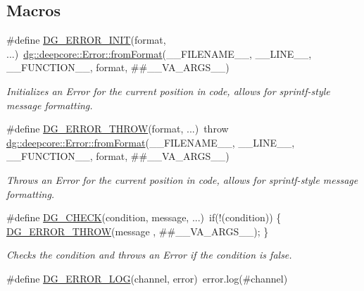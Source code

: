 \subsection*{Macros}
\begin{DoxyCompactItemize}
\item 
\#define \hyperlink{group___utility_module_ga3fd0b6b41d830c2e3b357841465ace88}{D\+G\+\_\+\+E\+R\+R\+O\+R\+\_\+\+I\+N\+IT}(format, ...)~\hyperlink{group___utility_module_ga00500e337578c7170d2608cb93af4f51}{dg\+::deepcore\+::\+Error\+::from\+Format}(\+\_\+\+\_\+\+F\+I\+L\+E\+N\+A\+M\+E\+\_\+\+\_\+, \+\_\+\+\_\+\+L\+I\+N\+E\+\_\+\+\_\+, \+\_\+\+\_\+\+F\+U\+N\+C\+T\+I\+O\+N\+\_\+\+\_\+, format, \#\#\+\_\+\+\_\+\+V\+A\+\_\+\+A\+R\+G\+S\+\_\+\+\_\+)
\begin{DoxyCompactList}\small\item\em Initializes an Error for the current position in code, allows for sprintf-\/style message formatting. \end{DoxyCompactList}\item 
\#define \hyperlink{group___utility_module_ga71c74d9e1b6d7f9d8896d6818a5a0cdf}{D\+G\+\_\+\+E\+R\+R\+O\+R\+\_\+\+T\+H\+R\+OW}(format, ...)~throw \hyperlink{group___utility_module_ga00500e337578c7170d2608cb93af4f51}{dg\+::deepcore\+::\+Error\+::from\+Format}(\+\_\+\+\_\+\+F\+I\+L\+E\+N\+A\+M\+E\+\_\+\+\_\+, \+\_\+\+\_\+\+L\+I\+N\+E\+\_\+\+\_\+, \+\_\+\+\_\+\+F\+U\+N\+C\+T\+I\+O\+N\+\_\+\+\_\+, format, \#\#\+\_\+\+\_\+\+V\+A\+\_\+\+A\+R\+G\+S\+\_\+\+\_\+)
\begin{DoxyCompactList}\small\item\em Throws an Error for the current position in code, allows for sprintf-\/style message formatting. \end{DoxyCompactList}\item 
\#define \hyperlink{group___utility_module_ga7f4f3b960c6275e5faa4d14f15f71f7d}{D\+G\+\_\+\+C\+H\+E\+CK}(condition,  message, ...)~if(!(condition)) \{ \hyperlink{group___utility_module_ga71c74d9e1b6d7f9d8896d6818a5a0cdf}{D\+G\+\_\+\+E\+R\+R\+O\+R\+\_\+\+T\+H\+R\+OW}(message , \#\#\+\_\+\+\_\+\+V\+A\+\_\+\+A\+R\+G\+S\+\_\+\+\_\+); \}
\begin{DoxyCompactList}\small\item\em Checks the condition and throws an Error if the condition is false. \end{DoxyCompactList}\item 
\#define \hyperlink{group___utility_module_ga43295d768f6d9ee49180610e3d1a99ee}{D\+G\+\_\+\+E\+R\+R\+O\+R\+\_\+\+L\+OG}(channel,  error)~error.\+log(\#channel)

\end{DoxyCompactItemize}
